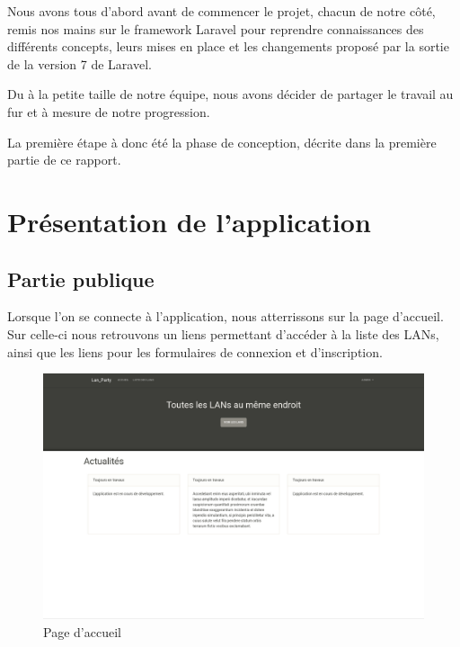 \documentclass[12pt]{article}
\begin{document}
Nous avons tous d'abord avant de commencer le projet, chacun de notre côté, remis nos mains sur le framework
Laravel pour reprendre connaissances des différents concepts, leurs mises en place et les changements proposé par la sortie de la version 7 de Laravel.

Du à la petite taille de notre équipe, nous avons décider de partager le travail au fur et à mesure de notre progression.

La première étape à donc été la phase de conception, décrite dans la première partie de ce rapport.
\newpage

\section{Présentation de l'application}

\subsection{Partie publique}
Lorsque l'on se connecte à l'application, nous atterrissons sur la page d'accueil. Sur celle-ci nous retrouvons un liens permettant d'accéder à la liste des LANs, ainsi que les liens pour les formulaires de connexion et d'inscription.

\begin{figure}[H]
\centering
\includegraphics[scale=0.20]{images/accueil.png}
\caption{Page d'accueil}
\label{}
\end{figure}
\end{document}
